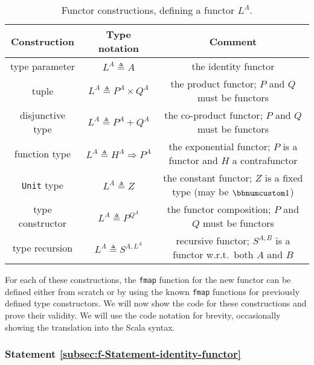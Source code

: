 \begin{table}
\begin{centering}
\begin{tabular}{|c|c|c|}
\hline 
\textbf{Construction} & \textbf{Type notation} & \textbf{Comment}\tabularnewline
\hline 
\hline 
{\footnotesize{}type parameter} & {\footnotesize{}$L^{A}\triangleq A$} & {\footnotesize{}the identity functor}\tabularnewline
\hline 
{\footnotesize{}tuple} & {\footnotesize{}$L^{A}\triangleq P^{A}\times Q^{A}$} & {\footnotesize{}the product functor; $P$ and $Q$ must be functors}\tabularnewline
\hline 
{\footnotesize{}disjunctive type} & {\footnotesize{}$L^{A}\triangleq P^{A}+Q^{A}$} & {\footnotesize{}the co-product functor; $P$ and $Q$ must be functors}\tabularnewline
\hline 
{\footnotesize{}function type} & {\footnotesize{}$L^{A}\triangleq H^{A}\Rightarrow P^{A}$} & {\footnotesize{}the exponential functor; $P$ is a functor and $H$
a contrafunctor}\tabularnewline
\hline 
{\footnotesize{}}\lstinline!Unit!{\footnotesize{} type} & {\footnotesize{}$L^{A}\triangleq Z$} & {\footnotesize{}the constant functor; $Z$ is a fixed type (may be
$\bbnum 1$)}\tabularnewline
\hline 
{\footnotesize{}type constructor} & {\footnotesize{}$L^{A}\triangleq P^{Q^{A}}$} & {\footnotesize{}the functor composition; $P$ and $Q$ must be functors}\tabularnewline
\hline 
{\footnotesize{}type recursion} & {\footnotesize{}$L^{A}\triangleq S^{A,L^{A}}$} & {\footnotesize{}recursive functor; $S^{A,B}$ is a functor w.r.t.~both
$A$ and $B$}\tabularnewline
\hline 
\end{tabular}
\par\end{centering}
\caption{Functor constructions, defining a functor $L^{A}$.\label{tab:f-Functor-constructions}}
\end{table}

For each of these constructions, the \lstinline!fmap! function for
the new functor can be defined either from scratch or by using the
known \lstinline!fmap! functions for previously defined type constructors.
We will now show the code for these constructions and prove their
validity. We will use the code notation for brevity, occasionally
showing the translation into the Scala syntax.

\subsubsection{Statement \label{subsec:f-Statement-identity-functor}\ref{subsec:f-Statement-identity-functor}}

